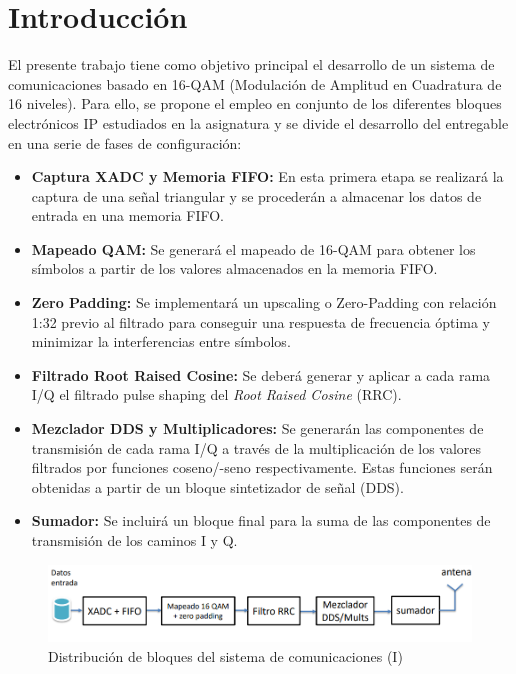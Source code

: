 \chapter{Introducción}
\label{section:intro}

El presente trabajo tiene como objetivo principal el desarrollo de un sistema de comunicaciones basado en 16-QAM (Modulación de Amplitud en Cuadratura de 16 niveles). Para ello, se propone el empleo en conjunto de los diferentes bloques electrónicos IP estudiados en la asignatura y se divide el desarrollo del entregable en una serie de fases de configuración:

\vspace{2mm}

\begin{itemize}
    \item \textbf{Captura XADC y Memoria FIFO:} En esta primera etapa se realizará la captura de una señal triangular y se procederán a almacenar los datos de entrada en una memoria FIFO.
    \item \textbf{Mapeado QAM: } Se generará el mapeado de 16-QAM para obtener los símbolos a partir de los valores almacenados en la memoria FIFO. 
    \item \textbf{Zero Padding: } Se implementará un upscaling o Zero-Padding con relación 1:32 previo al filtrado para conseguir una respuesta de frecuencia óptima y minimizar la interferencias entre símbolos.
    \item \textbf{Filtrado Root Raised Cosine: } Se deberá generar y aplicar a cada rama I/Q el filtrado pulse shaping del \textit{Root Raised Cosine} (RRC).
    \item \textbf{Mezclador DDS y Multiplicadores: } Se generarán las componentes de transmisión de cada rama I/Q a través de la multiplicación de los valores filtrados por funciones coseno/-seno respectivamente. Estas funciones serán obtenidas a partir de un bloque sintetizador de señal (DDS).
    \item \textbf{Sumador: } Se incluirá un bloque final para la suma de las componentes de transmisión de los caminos I y Q.   
\end{itemize}

\vspace{3mm}

    \begin{figure}[h]
    	\centering
    	\includegraphics[width=1\textwidth]{img/diseno/sistema.PNG}
    	\caption{Distribución de bloques del sistema de comunicaciones (I)}
    	\label{fig:sistema}
    \end{figure}
    
